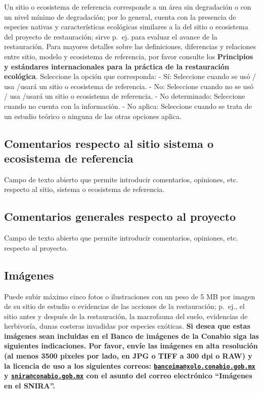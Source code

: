 \documentclass[
]{book}
\begin{document}
Un sitio o ecosistema de referencia corresponde a un área sin degradación o con un nivel mínimo de degradación; por lo general, cuenta con la presencia de especies nativas y características ecológicas similares a la del sitio o ecosistema del proyecto de restauración; sirve p.~ej.
para evaluar el avance de la restauración.
Para mayores detalles sobre las definiciones, diferencias y relaciones entre sitio, modelo y ecosistema de referencia, por favor consulte los \textbf{Principios y estándares internacionales para la práctica de la restauración ecológica}.
Seleccione la opción que corresponda: - Sí: Seleccione cuando se usó / usa /usará un sitio o ecosistema de referencia.
- No: Seleccione cuando no se usó / usa /usará un sitio o ecosistema de referencia.
- No determinado: Seleccione cuando no cuenta con la información.
- No aplica: Seleccione cuando se trata de un estudio teórico o ninguna de las otras opciones aplica.

\hypertarget{comentarios-respecto-al-sitio-sistema-o-ecosistema-de-referencia}{%
\subsection{Comentarios respecto al sitio sistema o ecosistema de referencia}\label{comentarios-respecto-al-sitio-sistema-o-ecosistema-de-referencia}}

Campo de texto abierto que permite introducir comentarios, opiniones, etc. respecto al sitio, sistema o ecosistema de referencia.

\hypertarget{comentarios-generales-respecto-al-proyecto}{%
\subsection{Comentarios generales respecto al proyecto}\label{comentarios-generales-respecto-al-proyecto}}

Campo de texto abierto que permite introducir comentarios, opiniones, etc. respecto al proyecto.

\hypertarget{imuxe1genes}{%
\subsection{Imágenes}\label{imuxe1genes}}

Puede subir máximo cinco fotos o ilustraciones con un peso de 5 MB por imagen de su sitio de estudio o evidencias de las acciones de la restauración; p.~ej., el sitio antes y después de la restauración, la macrofauna del suelo, evidencias de herbivoría, dunas costeras invadidas por especies exóticas.
\textbf{Si desea que estas imágenes sean incluidas en el Banco de imágenes de la Conabio siga las siguientes indicaciones. Por favor, envíe las imágenes en alta resolución (al menos 3500 pixeles por lado, en JPG o TIFF a 300 dpi o RAW) y la licencia de uso a los siguientes correos: \href{mailto:bancoima@xolo.conabio.gob.mx}{\nolinkurl{bancoima@xolo.conabio.gob.mx}} y \href{mailto:snira@conabio.gob.mx}{\nolinkurl{snira@conabio.gob.mx}} con el asunto del correo electrónico ``Imágenes en el SNIRA''.}
\end{document}
